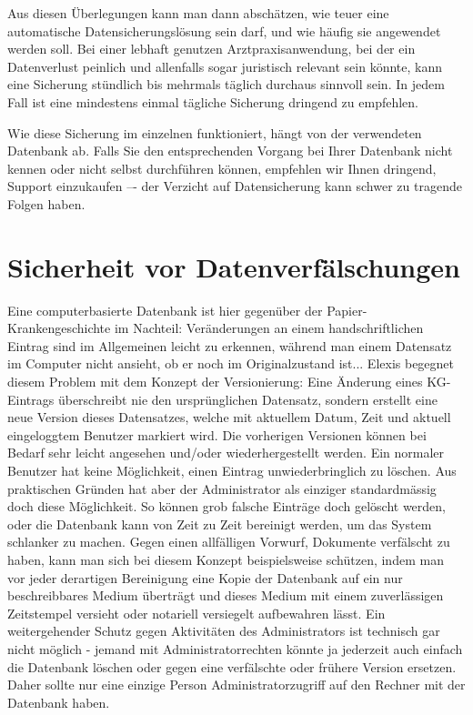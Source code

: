 Aus diesen Überlegungen kann man dann abschätzen, wie teuer eine automatische
Datensicherungslösung sein darf, und wie häufig sie angewendet werden soll.
Bei einer lebhaft genutzen Arztpraxisanwendung, bei der ein Datenverlust peinlich und
allenfalls sogar juristisch relevant sein könnte, kann eine Sicherung stündlich bis mehrmals
täglich durchaus sinnvoll sein. In jedem Fall ist eine mindestens einmal tägliche Sicherung
dringend zu empfehlen.

Wie diese Sicherung im einzelnen funktioniert, hängt von der verwendeten Datenbank ab.
Falls Sie den entsprechenden Vorgang bei Ihrer Datenbank nicht kennen oder nicht selbst
durchführen können, empfehlen wir Ihnen dringend, Support einzukaufen –- der Verzicht auf
Datensicherung kann schwer zu tragende Folgen haben.

\section{Sicherheit vor Datenverfälschungen}

Eine computerbasierte Datenbank ist hier gegenüber der Papier-Krankengeschichte im Nachteil:
Veränderungen an einem handschriftlichen Eintrag sind im Allgemeinen leicht zu erkennen, während
man einem Datensatz im Computer nicht ansieht, ob er noch im Originalzustand ist... Elexis
begegnet diesem Problem mit dem Konzept der Versionierung: Eine Änderung eines KG-Eintrags
überschreibt nie den ursprünglichen Datensatz, sondern erstellt eine neue Version dieses
Datensatzes, welche mit aktuellem Datum, Zeit und aktuell eingeloggtem Benutzer markiert wird.
Die vorherigen Versionen können bei Bedarf sehr leicht angesehen und/oder wiederhergestellt werden.
Ein normaler Benutzer hat keine Möglichkeit, einen Eintrag unwiederbringlich zu löschen.
Aus praktischen Gründen hat aber der Administrator als einziger standardmässig doch diese
Möglichkeit. So können grob falsche Einträge doch gelöscht werden, oder die Datenbank kann von
Zeit zu Zeit bereinigt werden, um das System schlanker zu machen. Gegen einen allfälligen Vorwurf,
Dokumente verfälscht zu haben, kann man sich bei diesem Konzept beispielsweise schützen, indem man
vor jeder derartigen Bereinigung eine Kopie der Datenbank auf ein nur beschreibbares Medium
überträgt und dieses Medium mit einem zuverlässigen Zeitstempel versieht oder notariell versiegelt
aufbewahren lässt. Ein weitergehender Schutz gegen Aktivitäten des Administrators ist technisch gar
nicht möglich - jemand mit Administratorrechten könnte ja jederzeit auch einfach die Datenbank
löschen oder gegen eine verfälschte oder frühere Version ersetzen. Daher sollte nur eine einzige
Person Administratorzugriff auf den Rechner mit der Datenbank haben.

